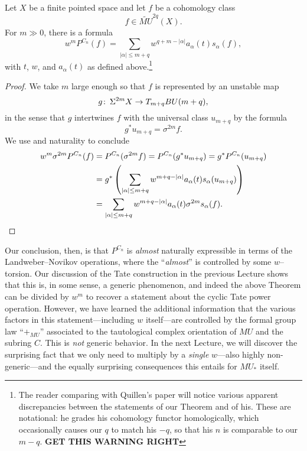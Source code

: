 \begin{theorem}\label{QuillensKeyRelation}
Let $X$ be a finite pointed space and let $f$ be a cohomology class \[f \in \widetilde{MU}^{2q}(X).\]  For $m \gg 0$, there is a formula \[w^m P^{C_n}(f) = \sum_{|\alpha| \le m+q} w^{q+m - |\alpha|} a_\alpha(t) s_\alpha(f),\] with $t$, $w$, and $a_\alpha(t)$ as defined above.\footnote{The reader comparing with Quillen's paper will notice various apparent discrepancies between the statements of our Theorem and of his.  These are notational: he grades his cohomology functor homologically, which occasionally causes our $q$ to match his $-q$, so that his $n$ is comparable to our $m-q$.  \textbf{GET THIS WARNING RIGHT}}
\end{theorem}
\begin{proof}
We take $m$ large enough so that $f$ is represented by an unstable map \[g\colon\thinspace \Sigma^{2m} X \to T_{m+q} BU(m+q),\] in the sense that $g$ intertwines $f$ with the universal class $u_{m+q}$ by the formula \[g^* u_{m+q} = \sigma^{2m} f.\]  We use  and naturality to conclude
\begin{align*}
w^m \sigma^{2m} P^{C_n}(f) & = P^{C_n}(\sigma^{2m} f) = P^{C_n}(g^* u_{m+q}) = g^* P^{C_n}(u_{m+q}) \\
& = g^* \left(\sum_{|\alpha| \le m+q} w^{m+q - |\alpha|} a_\alpha(t) s_\alpha(u_{m+q}) \right) \\
& = \sum_{|\alpha| \le m+q} w^{m+q - |\alpha|} a_\alpha(t) \sigma^{2m} s_\alpha(f). \qedhere
\end{align*}
\end{proof}

Our conclusion, then, is that $P^{C_n}$ is \emph{almost} naturally expressible in terms of the Landweber--Novikov operations, where the ``\emph{almost}'' is controlled by some $w$--torsion.  Our discussion of the Tate construction in the previous Lecture shows that this is, in some sense, a generic phenomenon, and indeed the above Theorem can be divided by $w^m$ to recover a statement about the cyclic Tate power operation.  However, we have learned the additional information that the various factors in this statement---including $w$ itself---are controlled by the formal group law ``$+_{MU}$'' associated to the tautological complex orientation of $MU$ and the subring $C$.  This is \emph{not} generic behavior.  In the next Lecture, we will discover the surprising fact that we only need to multiply by a \emph{single} $w$---also highly non-generic---and the equally surprising consequences this entails for $MU_*$ itself.











